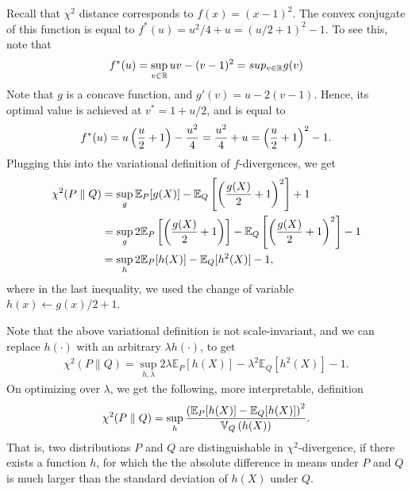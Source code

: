         \begin{example}
            \label{example:chi-squared-variational-def} Recall that $\chi^2$ distance corresponds to $f(x) = (x-1)^2$. The convex conjugate of this function is equal to $f^*(u) = u^2/4 + u =  (u/2 + 1)^2 - 1$. To see this, note that 
            \begin{align}
                f^*(u) = \sup_{v \in \mathbb{R}} uv - (v-1)^2 = sup_{v \in \mathbb{R}} g(v)
            \end{align}
            Note that $g$ is a concave function, and $g'(v) = u - 2(v-1)$. Hence, its optimal value is achieved at $v^* = 1 + u/2$, and is equal to 
            \begin{align}
                f^*(u) = u \left( \frac{u}{2} + 1 \right) - \frac{u^2}{4} = \frac{u^2}{4} + u = \left( \frac{u}{2} + 1 \right)^2- 1. 
            \end{align}
            Plugging this into the variational definition of $f$-divergences, we get 
            \begin{align}
                \chi^2(P\parallel Q) &= \sup_{g} \mathbb{E}_P[g(X)] - \mathbb{E}_Q\left[ \left( \frac{g(X)}{2} + 1 \right)^2 \right] + 1  \\
                & = \sup_{g} 2 \mathbb{E}_P \left[ \left( \frac{g(X)}{2} +1 \right) \right] - \mathbb{E}_Q \left[ \left( \frac{g(X)}{2} + 1 \right)^2 \right] - 1 \\
                & = \sup_{h} 2 \mathbb{E}_P[h(X)] - \mathbb{E}_Q[h^2(X)] - 1, 
            \end{align}
            where in the last inequality, we used the change of variable $h(x) \leftarrow g(x)/2 + 1$. 

            Note that the above variational definition is not scale-invariant, and we can replace $h(\cdot)$ with an arbitrary $\lambda h(\cdot)$, to get 
            \begin{align}
                \chi^2(P \parallel Q) = \sup_{h, \lambda} 2 \lambda \mathbb{E}_P[h(X)] - \lambda^2 \mathbb{E}_Q[h^2(X)] - 1. 
            \end{align}
            On optimizing over $\lambda$, we get the following, more interpretable, definition 
            \begin{align}
                \chi^2(P \parallel Q) = \sup_{h } \frac{\left( \mathbb{E}_P[h(X)] - \mathbb{E}_Q[h(X)] \right)^2}{\mathbb{V}_Q\left( h(X) \right) }. 
            \end{align}
            That is, two distributions $P$ and $Q$ are distinguishable in $\chi^2$-divergence, if there exists a function $h$, for which the the absolute difference in means under $P$ and $Q$ is much larger than the standard deviation of $h(X)$ under $Q$. 
        \end{example}

